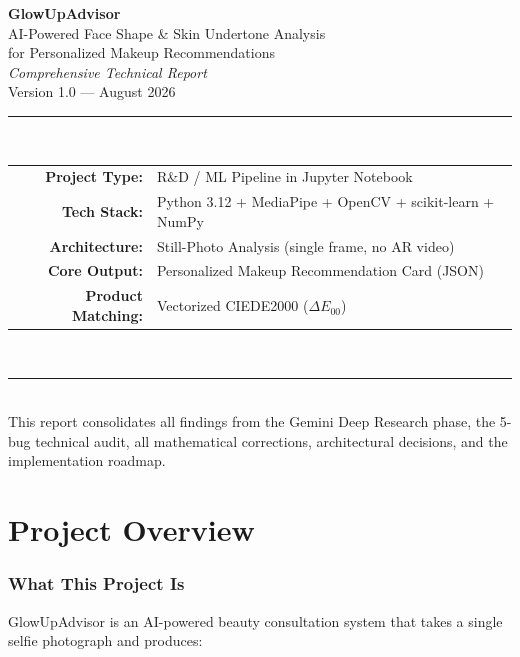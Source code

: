 \documentclass[12pt,a4paper]{article}
\begin{document}
\begin{titlepage}
\centering
\vspace*{2cm}
{\Huge\bfseries GlowUpAdvisor}\\[0.5cm]
{\LARGE AI-Powered Face Shape \& Skin Undertone Analysis\\for Personalized Makeup Recommendations}\\[2cm]
{\Large\itshape Comprehensive Technical Report}\\[0.5cm]
{\large Version 1.0 --- August 2026}\\[3cm]
\rule{\textwidth}{1pt}\\[1cm]
{\large
\begin{tabular}{rl}
\textbf{Project Type:} & R\&D / ML Pipeline in Jupyter Notebook \\
\textbf{Tech Stack:} & Python 3.12 + MediaPipe + OpenCV + scikit-learn + NumPy \\
\textbf{Architecture:} & Still-Photo Analysis (single frame, no AR video) \\
\textbf{Core Output:} & Personalized Makeup Recommendation Card (JSON) \\
\textbf{Product Matching:} & Vectorized CIEDE2000 ($\Delta E_{00}$) \\
\end{tabular}
}\\[2cm]
\rule{\textwidth}{1pt}\\[1cm]
{\small This report consolidates all findings from the Gemini Deep Research phase, the 5-bug technical audit, all mathematical corrections, architectural decisions, and the implementation roadmap.}
\end{titlepage}

\newpage
\tableofcontents
\newpage

\part{Project Overview}

\section{What This Project Is}

GlowUpAdvisor is an AI-powered beauty consultation system that takes a single selfie photograph and produces:
\end{document}
